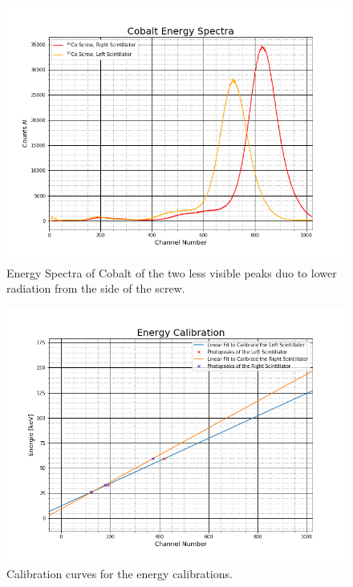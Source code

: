 \documentclass[30pt,a4paper]{article}
\begin{document}
	\begin{figure}[h]
		\includegraphics[scale=0.5]{Bilder/Cobalt_Energy_Spectra2}
		\centering
		\caption{Energy Spectra of Cobalt of the two less visible peaks duo to lower radiation from the side of the screw.}
		\label{2cobaltspectra}
	\end{figure}
	\begin{figure}[h]
		\includegraphics[scale=0.5]{Bilder/EnergyCalib}
		\centering
		\caption{Calibration curves for the energy calibrations.}
		\label{EnergieCalib}
	\end{figure}
\end{document}
